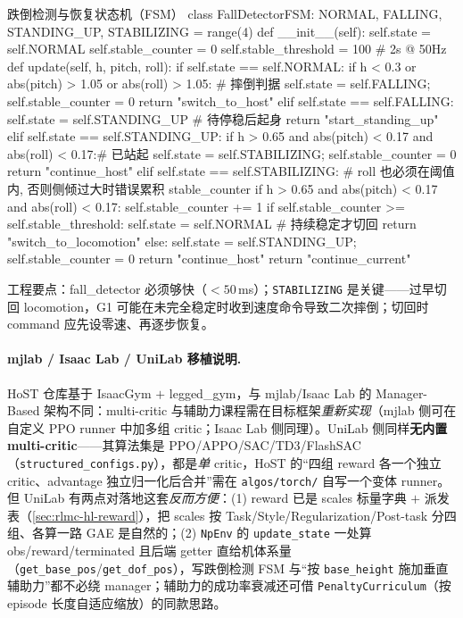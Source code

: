 \begin{codebox}[Python]{跌倒检测与恢复状态机（FSM）}
class FallDetectorFSM:
    NORMAL, FALLING, STANDING_UP, STABILIZING = range(4)
    def __init__(self):
        self.state = self.NORMAL
        self.stable_counter = 0
        self.stable_threshold = 100        # 2s @ 50Hz
    def update(self, h, pitch, roll):
        if self.state == self.NORMAL:
            if h < 0.3 or abs(pitch) > 1.05 or abs(roll) > 1.05:   # 摔倒判据
                self.state = self.FALLING; self.stable_counter = 0
                return "switch_to_host"
        elif self.state == self.FALLING:
            self.state = self.STANDING_UP                          # 待停稳后起身
            return "start_standing_up"
        elif self.state == self.STANDING_UP:
            if h > 0.65 and abs(pitch) < 0.17 and abs(roll) < 0.17:# 已站起
                self.state = self.STABILIZING; self.stable_counter = 0
            return "continue_host"
        elif self.state == self.STABILIZING:
            # roll 也必须在阈值内, 否则侧倾过大时错误累积 stable_counter
            if h > 0.65 and abs(pitch) < 0.17 and abs(roll) < 0.17:
                self.stable_counter += 1
                if self.stable_counter >= self.stable_threshold:
                    self.state = self.NORMAL                       # 持续稳定才切回
                    return "switch_to_locomotion"
            else:
                self.state = self.STANDING_UP; self.stable_counter = 0
            return "continue_host"
        return "continue_current"
\end{codebox}

工程要点：fall\_detector 必须够快（$<50$\,ms）；\texttt{STABILIZING} 是关键——过早切回 locomotion，G1 可能在未完全稳定时收到速度命令导致二次摔倒；切回时 command 应先设零速、再逐步恢复。

\paragraph{mjlab / Isaac Lab / UniLab 移植说明.}
HoST 仓库基于 IsaacGym $+$ legged\_gym，与 mjlab/Isaac Lab 的 Manager-Based 架构不同：multi-critic 与辅助力课程需在目标框架\emph{重新实现}（mjlab 侧可在自定义 PPO runner 中加多组 critic；Isaac Lab 侧同理）。UniLab 侧同样\textbf{无内置 multi-critic}——其算法集是 PPO/APPO/SAC/TD3/FlashSAC（\texttt{structured\_configs.\allowbreak py}），都是\emph{单} critic，HoST 的“四组 reward 各一个独立 critic、advantage 独立归一化后合并”需在 \texttt{algos/\allowbreak torch/\allowbreak } 自写一个变体 runner。但 UniLab 有两点对落地这套\emph{反而方便}：(1) reward 已是 scales 标量字典 $+$ 派发表（\cref{sec:rlmc-hl-reward}），把 scales 按 Task/Style/Regularization/Post-task 分四组、各算一路 GAE 是自然的；(2) \texttt{NpEnv} 的 \texttt{update\_state} 一处算 obs/reward/terminated 且后端 getter 直给机体系量（\texttt{get\_base\_pos}/\allowbreak\texttt{get\_dof\_pos}），写跌倒检测 FSM 与“按 \texttt{base\_height} 施加垂直辅助力”都不必绕 manager；辅助力的成功率衰减还可借 \texttt{PenaltyCurriculum}（按 episode 长度自适应缩放）的同款思路。

